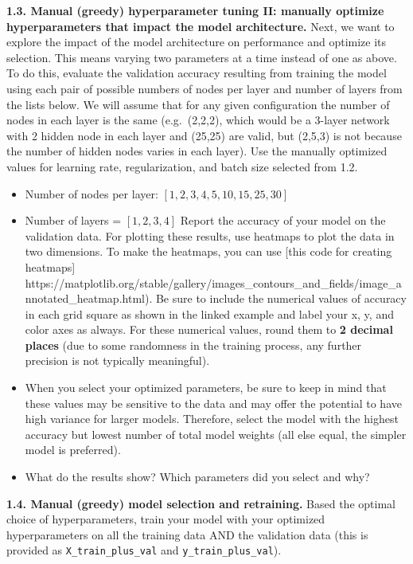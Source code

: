 \documentclass[
  letterpaper,
  DIV=11,
  numbers=noendperiod]{scrartcl}
\begin{document}
\textbf{1.3. Manual (greedy) hyperparameter tuning II: manually optimize
hyperparameters that impact the model architecture.} Next, we want to
explore the impact of the model architecture on performance and optimize
its selection. This means varying two parameters at a time instead of
one as above. To do this, evaluate the validation accuracy resulting
from training the model using each pair of possible numbers of nodes per
layer and number of layers from the lists below. We will assume that for
any given configuration the number of nodes in each layer is the same
(e.g.~(2,2,2), which would be a 3-layer network with 2 hidden node in
each layer and (25,25) are valid, but (2,5,3) is not because the number
of hidden nodes varies in each layer). Use the manually optimized values
for learning rate, regularization, and batch size selected from 1.2.

\begin{itemize}
\item
  Number of nodes per layer: \([1,2,3,4,5,10,15,25,30]\)
\item
  Number of layers = \([1,2,3,4]\) Report the accuracy of your model on
  the validation data. For plotting these results, use heatmaps to plot
  the data in two dimensions. To make the heatmaps, you can use {[}this
  code for creating heatmaps{]}
  https://matplotlib.org/stable/gallery/images\_contours\_and\_fields/image\_annotated\_heatmap.html).
  Be sure to include the numerical values of accuracy in each grid
  square as shown in the linked example and label your x, y, and color
  axes as always. For these numerical values, round them to \textbf{2
  decimal places} (due to some randomness in the training process, any
  further precision is not typically meaningful).
\item
  When you select your optimized parameters, be sure to keep in mind
  that these values may be sensitive to the data and may offer the
  potential to have high variance for larger models. Therefore, select
  the model with the highest accuracy but lowest number of total model
  weights (all else equal, the simpler model is preferred).
\item
  What do the results show? Which parameters did you select and why?
\end{itemize}

\textbf{1.4. Manual (greedy) model selection and retraining.} Based the
optimal choice of hyperparameters, train your model with your optimized
hyperparameters on all the training data AND the validation data (this
is provided as \texttt{X\_train\_plus\_val} and
\texttt{y\_train\_plus\_val}).
\end{document}
